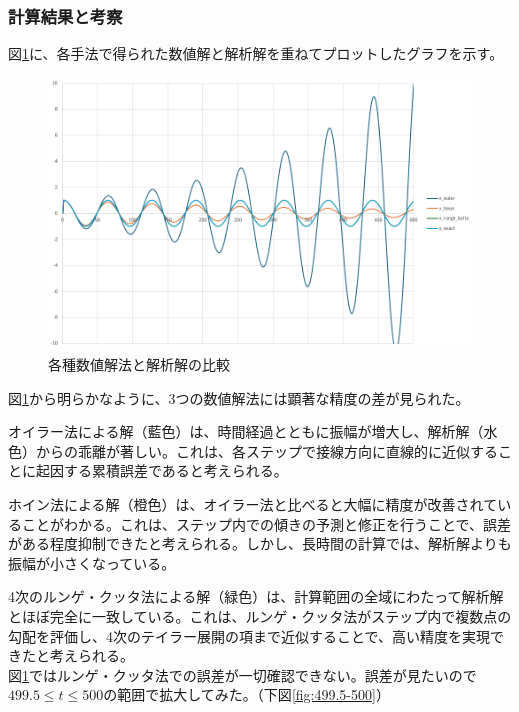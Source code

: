 \documentclass[dvipdfmx,a4paper]{jsarticle}
\begin{document}
\vspace{5mm}



\subsubsection{計算結果と考察}
図\ref{fig:comparison}に、各手法で得られた数値解と解析解を重ねてプロットしたグラフを示す。

\begin{figure}[H]
    \centering
    \includegraphics[width=0.9\linewidth]{summer/software-engineering/result_all_methods_01.png} 
    \caption{各種数値解法と解析解の比較}
    \label{fig:comparison}
\end{figure}

図\ref{fig:comparison}から明らかなように、3つの数値解法には顕著な精度の差が見られた。


オイラー法による解（藍色）は、時間経過とともに振幅が増大し、解析解（水色）からの乖離が著しい。これは、各ステップで接線方向に直線的に近似することに起因する累積誤差であると考えられる。


ホイン法による解（橙色）は、オイラー法と比べると大幅に精度が改善されていることがわかる。これは、ステップ内での傾きの予測と修正を行うことで、誤差がある程度抑制できたと考えられる。しかし、長時間の計算では、解析解よりも振幅が小さくなっている。


4次のルンゲ・クッタ法による解（緑色）は、計算範囲の全域にわたって解析解とほぼ完全に一致している。これは、ルンゲ・クッタ法がステップ内で複数点の勾配を評価し、4次のテイラー展開の項まで近似することで、高い精度を実現できたと考えられる。\\
図\ref{fig:comparison}ではルンゲ・クッタ法での誤差が一切確認できない。誤差が見たいので$499.5\leq t \leq 500$の範囲で拡大してみた。（下図\ref{fig:499.5-500}）
\end{document}
